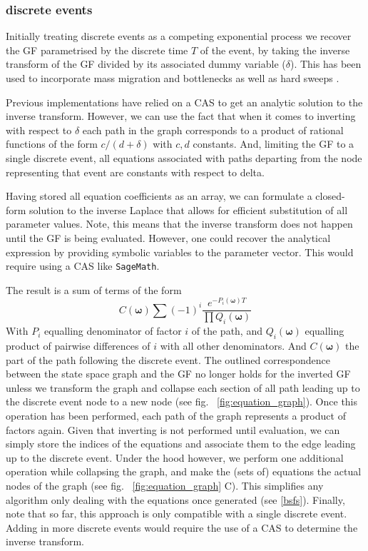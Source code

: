 \documentclass[10pt, a4]{article}
\begin{document}
\subsubsection{discrete events} \label{discrete_events}

Initially treating discrete events as a competing exponential process we recover the GF parametrised by the discrete time $T$ of the event, by taking the inverse transform of the GF divided by its associated dummy variable ($\delta$). This has been used to incorporate mass migration and bottlenecks \citep{Lohse2011, Bunnefeld2015} as well as hard sweeps \citep{Bisschop2021}. 

Previous implementations have relied on a CAS to get an analytic solution to the inverse transform. However, we can use the fact that when it comes to inverting with respect to $\delta$ each path in the graph corresponds to a product of rational functions of the form $c/(d + \delta)$ with $c, d$ constants. And, limiting the GF to a single discrete event, all equations associated with paths departing from the node representing that event are constants with respect to delta.

Having stored all equation coefficients as an array, we can formulate a closed-form solution to the inverse Laplace that allows for efficient substitution of all parameter values. Note, this means that the inverse transform does not happen until the GF is being evaluated. However, one could recover the analytical expression by providing symbolic variables to the parameter vector. This would require using a CAS like \texttt{SageMath}.

The result is a sum of terms of the form 
\begin{equation}\label{eq:inverted_eq}
C(\boldsymbol\omega)\sum(-1)^{i}\frac{e^{-P_i(\boldsymbol\omega)T}}{\prod Q_i(\boldsymbol\omega)}
\end{equation}
With $P_i$ equalling denominator of factor $i$ of the path, and $Q_i(\boldsymbol\omega)$ equalling product of pairwise differences of $i$ with all other denominators. And $C(\boldsymbol\omega)$ the part of the path following the discrete event. The outlined correspondence between the state space graph and the GF no longer holds for the inverted GF unless we transform the graph and collapse each section of all path leading up to the discrete event node to a new node (see fig. \ \ref{fig:equation_graph}). Once this operation has been performed, each path of the graph represents a product of factors again. Given that inverting is not performed until evaluation, we can simply store the indices of the equations and associate them to the edge leading up to the discrete event. Under the hood however, we perform one additional operation while collapsing the graph, and make the (sets of) equations the actual nodes of the graph (see fig. \ \ref{fig:equation_graph} C). This simplifies any algorithm only dealing with the equations once generated (see \ref{bsfs}). Finally, note that so far, this approach is only compatible with a single discrete event. Adding in more discrete events would require the use of a CAS to determine the inverse transform.
\end{document}
